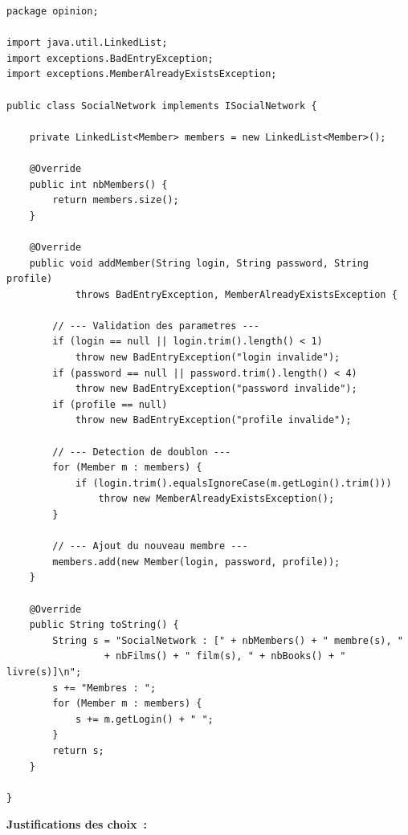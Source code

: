 \documentclass[12pt,a4paper]{article}
\begin{document}
\begin{lstlisting}[caption={Classe \texttt{SocialNetwork.java} -- méthodes implémentées}]
package opinion;

import java.util.LinkedList;
import exceptions.BadEntryException;
import exceptions.MemberAlreadyExistsException;

public class SocialNetwork implements ISocialNetwork {

    private LinkedList<Member> members = new LinkedList<Member>();

    @Override
    public int nbMembers() {
        return members.size();
    }

    @Override
    public void addMember(String login, String password, String profile)
            throws BadEntryException, MemberAlreadyExistsException {

        // --- Validation des parametres ---
        if (login == null || login.trim().length() < 1)
            throw new BadEntryException("login invalide");
        if (password == null || password.trim().length() < 4)
            throw new BadEntryException("password invalide");
        if (profile == null)
            throw new BadEntryException("profile invalide");

        // --- Detection de doublon ---
        for (Member m : members) {
            if (login.trim().equalsIgnoreCase(m.getLogin().trim()))
                throw new MemberAlreadyExistsException();
        }

        // --- Ajout du nouveau membre ---
        members.add(new Member(login, password, profile));
    }

    @Override
    public String toString() {
        String s = "SocialNetwork : [" + nbMembers() + " membre(s), "
                 + nbFilms() + " film(s), " + nbBooks() + " livre(s)]\n";
        s += "Membres : ";
        for (Member m : members) {
            s += m.getLogin() + " ";
        }
        return s;
    }

}
\end{lstlisting}

\textbf{Justifications des choix~:}
\end{document}
